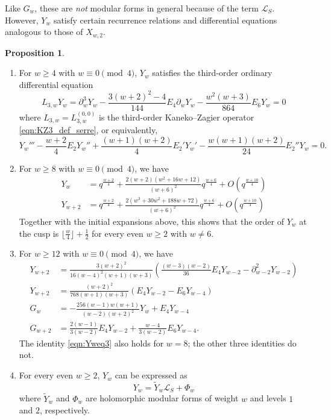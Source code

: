\documentclass[10pt,reqno]{amsproc}
\newcommand{\cL}{\mathcal{L}}
\newcommand{\1}{\mathds{1}}	%
\theoremstyle{definition}
\newtheorem{proposition}[theorem]{Proposition}
\theoremstyle{remark}
\begin{document}
Like $G_{w}$, these are \emph{not} modular forms in general because of the term $\cL_S$.
However, $Y_w$ satisfy certain recurrence relations and differential equations analogous to those of $X_{w, 2}$.
\begin{proposition}
\label{prop:Yproperties}
\begin{enumerate}
    \item For $w \geq 4$ with $w \equiv 0 \pmod{4}$, $Y_{w}$ satisfies the third-order ordinary differential equation
    \begin{equation}
        \label{eqn:Ywode}
        L_{3,w} Y_{w} = \partial_{w}^{3}Y_{w} - \frac{3(w+2)^2 - 4}{144} E_4 \partial_{w} Y_{w} - \frac{w^2(w+3)}{864} E_6 Y_{w} = 0
    \end{equation}
    where $L_{3,w} = L_{3,w}^{(0,0)}$ is the third-order Kaneko--Zagier operator \eqref{eqn:KZ3_def_serre}, or equivalently,
    \begin{equation}
        \label{eqn:Ywode2}
        Y_{w}''' - \frac{w+2}{4} E_2 Y_{w}'' + \frac{(w+1)(w+2)}{4} E_2' Y_{w}' - \frac{w(w+1)(w+2)}{24} E_2'' Y_w = 0.
    \end{equation}
    \item For $w \geq 8$ with $w \equiv 0 \pmod{4}$, we have
    \begin{align}
        Y_w &= q^{\frac{w + 2}{4}} + \frac{2(w + 2)(w^2 + 16w + 12)}{(w + 6)^2} q^{\frac{w + 6}{4}} + O(q^{\frac{w + 10}{4}}) \label{eqn:Yw4_qexp} \\
        Y_{w+2} &= q^{\frac{w + 2}{4}} + \frac{2(w^3 + 30 w^2 + 188w + 72)}{(w + 6)^2} q^{\frac{w + 6}{4}} + O(q^{\frac{w + 10}{4}}) \label{eqn:Yw4p2_qexp}
    \end{align}
    Together with the initial expansions above, this shows that the order of $Y_{w}$ at the cusp is $\lfloor \frac{w}{4} \rfloor + \frac{1}{2}$ for every even $w \geq 2$ with $w \neq 6$.
    \item For $w \geq 12$ with $w \equiv 0 \pmod{4}$, we have
    \begin{align}
        Y_{w+2} &= \frac{3(w+2)^{2}}{16(w-4)^{2}(w+1)(w+3)} \left(\frac{(w-3)(w-2)}{36} E_4 Y_{w-2} - \partial_{w-2}^{2} Y_{w-2}\right) \label{eqn:Yweq1}\\
        Y_{w+2} &= \frac{(w+2)^2}{768(w+1)(w+3)} (E_{4} Y_{w-2} - E_{6} Y_{w-4}) \label{eqn:Yweq2} \\
        G_{w} &= -\frac{256(w-1)w(w+1)}{(w-2)(w+2)^{2}} Y_{w} + E_{4} Y_{w-4} \label{eqn:Yweq3} \\
        G_{w+2} &= \frac{2(w-1)}{3(w-2)} E_{4} Y_{w-2} + \frac{w-4}{3(w-2)} E_{6} Y_{w-4}. \label{eqn:Yweq4}
    \end{align}
    The identity \eqref{eqn:Yweq3} also holds for $w=8$; the other three identities do not.
    \item For every even $w \ge 2$, $Y_w$ can be expressed as
    \[
        Y_w = \widetilde{Y}_{w} \cL_S + \Phi_w
    \]
    where $\widetilde{Y}_w$ and $\Phi_w$ are holomorphic modular forms of weight $w$ and levels $1$ and $2$, respectively.
\end{enumerate}
\end{proposition}
\end{document}
